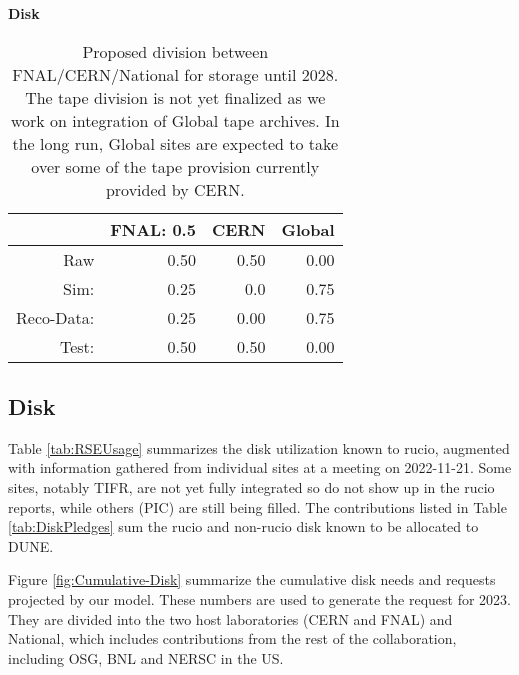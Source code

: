 \documentclass[12pt]{article}
\begin{document}
\begin{table}[h]
\begin{centering}
%

   {\bf Disk}
     \begin{tabular}{|rrrr|}
     \hline
 &FNAL: 0.5&CERN & Global \\
 \hline
 Raw&   0.50&   0.50&  0.00\\ 
 Sim: & 0.25&  0.0&  0.75\\
  Reco-Data: &  0.25&   0.00&  0.75\\ 
  Test: &  0.50& 0.50&   0.00\\
  \hline
   \end{tabular}
  \caption{Proposed division between FNAL/CERN/National for storage until 2028.  The tape division is not yet finalized as we work on integration of Global tape archives. In the long run, Global sites are expected to take over some of the tape provision currently provided by CERN. }

   \label{tab:division}
   \end{centering}
   \end{table}

\subsection{Disk}
Table \ref{tab:RSEUsage} summarizes the disk utilization known to rucio, augmented with information gathered from individual sites at a meeting on 2022-11-21.  Some sites, notably TIFR, are not yet fully integrated so do not show up in the rucio reports, while others (PIC) are still being filled.  The contributions listed in Table \ref{tab:DiskPledges} sum the rucio and non-rucio disk known to be allocated to DUNE.

Figure \ref{fig:Cumulative-Disk}  summarize the cumulative disk needs and requests projected by our model. These numbers are used to generate the request for 2023.  They are divided into the two host laboratories (CERN and FNAL) and National, which includes contributions from the rest of the collaboration, including OSG, BNL and NERSC in the US. 
\end{document}
